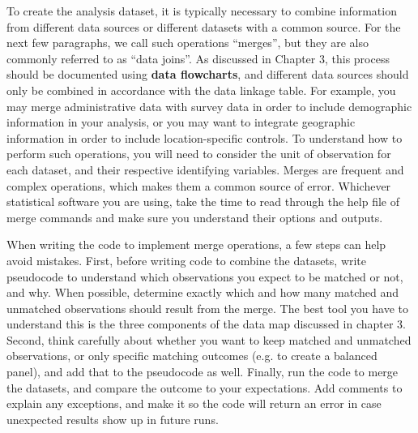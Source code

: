 To create the analysis dataset,
it is typically necessary to combine information
from different data sources
or different datasets with a common source.
For the next few paragraphs, 
we call such operations ``merges'',
but they are also commonly referred to as ``data joins''.
As discussed in Chapter 3,
this process should be documented
using \textbf{data flowcharts},
and different data sources should only be combined
in accordance with the data linkage table.
For example, you may merge administrative data with survey data
in order to include demographic information in your analysis,
or you may want to integrate geographic information
in order to include location-specific controls.
To understand how to perform such operations,
you will need to consider the unit of observation for each dataset,
and their respective identifying variables.
Merges are frequent and complex operations,
which makes them a common source of error.
Whichever statistical software you are using,
take the time to read through the help file of merge commands
and make sure you understand their options and outputs.

When writing the code to implement merge operations,
a few steps can help avoid mistakes.
First, before writing code to combine the datasets,
write pseudocode to understand which observations you expect to be
matched or not, and why.
When possible, determine exactly which and how many
matched and unmatched observations should result from the merge.
The best tool you have to understand this is
the three components of the data map discussed in chapter 3.
Second, think carefully about whether you want to keep matched and unmatched observations,
or only specific matching outcomes (e.g. to create a balanced panel),
and add that to the pseudocode as well.
Finally, run the code to merge the datasets,
and compare the outcome to your expectations.
Add comments to explain any exceptions,
and make it so the code will return an error in case unexpected results show up in future runs.


